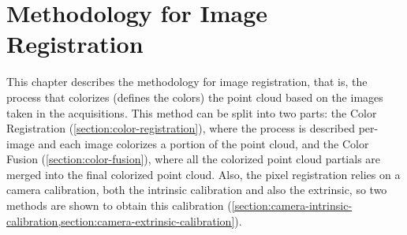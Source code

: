 \chapter{Methodology for Image Registration}
\label{section:methodology-for-image-registration}

This chapter describes the methodology for image registration, that is, the process that colorizes (defines the colors) the point cloud based on the images taken in the acquisitions. This method can be split into two parts: the Color Registration (\cref{section:color-registration}), where the process is described per-image and each image colorizes a portion of the point cloud, and the Color Fusion (\cref{section:color-fusion}), where all the colorized point cloud partials are merged into the final colorized point cloud. Also, the pixel registration relies on a camera calibration, both the intrinsic calibration and also the extrinsic, so two methods are shown to obtain this calibration (\cref{section:camera-intrinsic-calibration,section:camera-extrinsic-calibration}).







